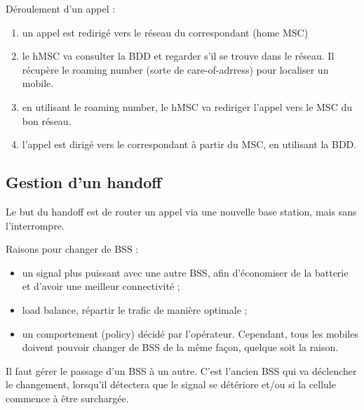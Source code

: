 	Déroulement d'un appel :
	
	\begin{enumerate}
		\item un appel est redirigé vers le réseau du correspondant (home MSC)
		\item le hMSC va consulter la BDD et regarder s'il se trouve dans le réseau. Il récupère le roaming number (sorte de care-of-adrress) pour localiser un mobile.
		\item en utilisant le roaming number, le hMSC va rediriger l'appel vers le MSC du bon réseau.
		\item l'appel est dirigé vers le correspondant à partir du MSC, en utilisant la BDD.
	\end{enumerate}
	
	
	\subsection{Gestion d'un handoff}
	
	Le but du handoff est de router un appel via une nouvelle base station, mais sans l'interrompre.
		
	Raisons pour changer de BSS :
	
	\begin{itemize}
		\item un signal plus puissant avec une autre BSS, afin d'économiser de la batterie et d'avoir une meilleur connectivité ;
		\item load balance, répartir le trafic de manière optimale ;
		\item un comportement (policy) décidé par l'opérateur. Cependant, tous les mobiles doivent pouvoir changer de BSS de la même façon, quelque soit la raison.
	\end{itemize}
	
	Il faut gérer le passage d'un BSS à un autre. C'est l'ancien BSS qui va déclencher le changement, lorsqu'il détectera que le signal se détériore et/ou si la cellule commence à être surchargée.
	
	
